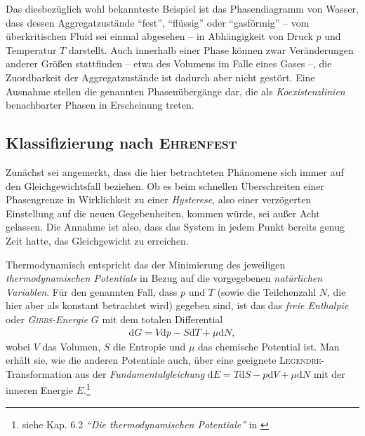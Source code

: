 \documentclass[a4paper, 10pt, twoside, openany]{book} %
\def \D {\mathrm d}
\begin{document}
Das diesbezüglich wohl bekannteste Beispiel ist das Phasendiagramm von Wasser, dass dessen Aggregatzustände "`fest"', "`flüssig"' oder "`gasförmig"' -- vom überkritischen Fluid sei einmal abgesehen -- in Abhängigkeit von Druck $p$ und Temperatur $T$ darstellt. Auch innerhalb einer Phase können zwar Veränderungen anderer Größen stattfinden -- etwa des Volumens im Falle eines Gases --, die Zuordbarkeit der Aggregatzustände ist dadurch aber nicht gestört. Eine Ausnahme stellen die genannten Phasenübergänge dar, die als \emph{Koexistenzlinien} benachbarter Phasen in Erscheinung treten.

\subsection{Klassifizierung nach \textsc{Ehrenfest}}

Zunächst sei angemerkt, dass die hier betrachteten Phänomene sich immer auf den Gleichgewichtsfall beziehen. Ob es beim schnellen Überschreiten einer Phasengrenze in Wirklichkeit zu einer \emph{Hysterese}, also einer verzögerten Einstellung auf die neuen Gegebenheiten, kommen würde, sei außer Acht gelassen. Die Annahme ist also, dass das System in jedem Punkt bereits genug Zeit hatte, das Gleichgewicht zu erreichen.

Thermodynamisch entspricht das der Minimierung des jeweiligen \emph{thermodynamischen Potentials} in Bezug auf die vorgegebenen \emph{natürlichen Variablen}. Für den genannten Fall, dass $p$ und $T$ (sowie die Teilchenzahl $N$, die hier aber als konstant betrachtet wird) gegeben sind, ist das das \emph{freie Enthalpie} oder \emph{\textsc{Gibbs}-Energie} $G$ mit dem totalen Differential
%
\begin{align*}
    \D G = V \D p - S \D T + \mu \D N,
\end{align*}
%
wobei $V$ das Volumen, $S$ die Entropie und $\mu$ das chemische Potential ist. Man erhält sie, wie die anderen Potentiale auch, über eine geeignete \textsc{Legendre}-Transformation aus der \emph{Fundamentalgleichung} $\D E = T \D S - p \D V + \mu \D N$ mit der inneren Energie $E$.\footnote{siehe Kap. 6.2 \emph{"`Die thermodynamischen Potentiale"'} in \cite{Jelitto}}
\end{document}
